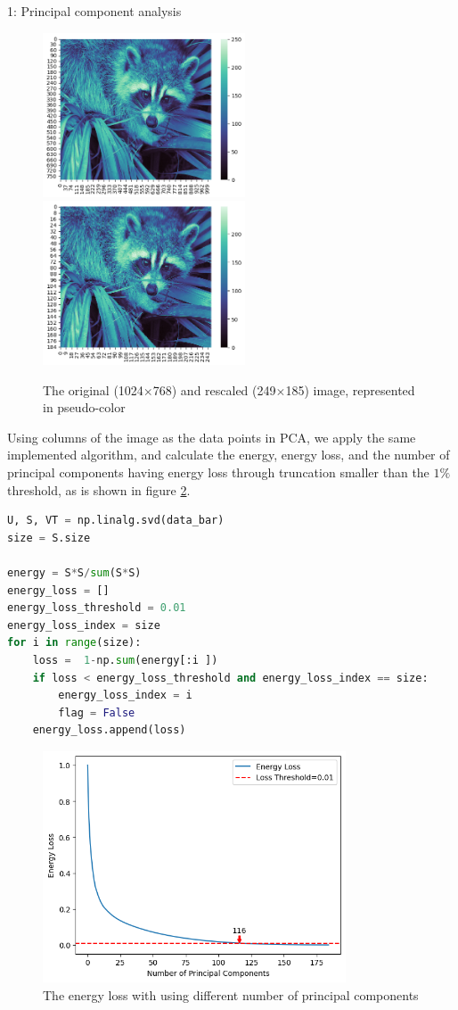 \documentclass[10pt,a4paper]{article}
\begin{document}
\begin{task}{1: Principal component analysis}
\begin{figure} [H]
    \centering
    \includegraphics[width=6cm]{images/task1-2-1.png}
    \includegraphics[width=6cm]{images/task1-2-2.png}
    \caption{The original (1024$\times$768) and rescaled (249$\times$185) image, represented in pseudo-color}
    \label{fig:task1-2-1}
\end{figure}

Using columns of the image as the
data points in PCA, we apply the same implemented algorithm, and calculate the energy, energy loss, and the number of principal components having energy loss through truncation smaller than the $1\%$ threshold, as is shown in figure \ref{fig:task1-2-loss}.

\begin{lstlisting}[language = Python, label={decoupling}]
U, S, VT = np.linalg.svd(data_bar)
size = S.size

energy = S*S/sum(S*S)
energy_loss = [] 
energy_loss_threshold = 0.01
energy_loss_index = size
for i in range(size):
    loss =  1-np.sum(energy[:i ])
    if loss < energy_loss_threshold and energy_loss_index == size:
        energy_loss_index = i
        flag = False
    energy_loss.append(loss)
\end{lstlisting}

\begin{figure} [H]
    \centering
    \includegraphics[width=9cm]{images/task1-2-loss.png}
    \caption{The energy loss with using different number of principal components}
    \label{fig:task1-2-loss}
\end{figure}


\end{task}
\end{document}
